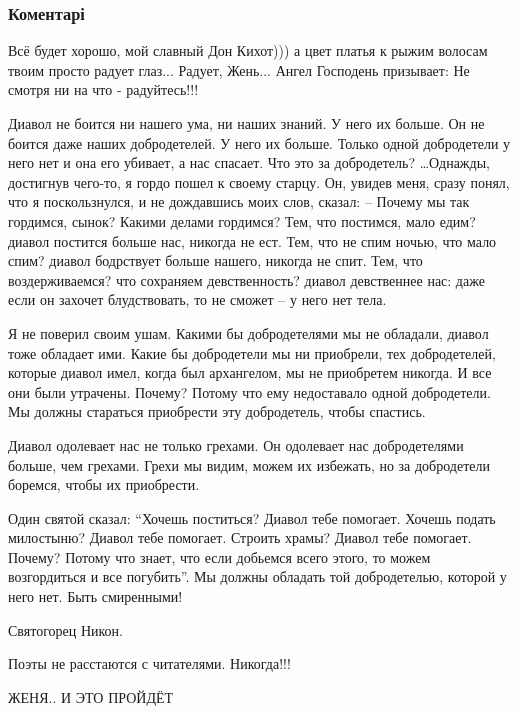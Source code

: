  
 
 
 
 
\subsubsection{Коментарі}
\label{sec:24_06_2021.fb.bilchenko_evgenia.3.kamni_mojej_princessy.cmt}
\begin{itemize}


Всё будет хорошо, мой славный Дон Кихот))) а цвет платья к рыжим волосам твоим
просто радует глаз... Радует, Жень... Ангел Господень призывает: Не смотря ни
на что - радуйтесь!!!


Диавол не боится ни нашего ума, ни наших знаний. У него их больше. Он не боится
даже наших добродетелей. У него их больше. Только одной добродетели у него нет
и она его убивает, а нас спасает. Что это за добродетель? …Однажды, достигнув
чего-то, я гордо пошел к своему старцу. Он, увидев меня, сразу понял, что я
поскользнулся, и не дождавшись моих слов, сказал: – Почему мы так гордимся,
сынок? Какими делами гордимся? Тем, что постимся, мало едим? диавол постится
больше нас, никогда не ест. Тем, что не спим ночью, что мало спим? диавол
бодрствует больше нашего, никогда не спит. Тем, что воздерживаемся? что
сохраняем девственность? диавол девственнее нас: даже если он захочет
блудствовать, то не сможет – у него нет тела.

Я не поверил своим ушам. Какими бы добродетелями мы не обладали, диавол тоже
обладает ими. Какие бы добродетели мы ни приобрели, тех добродетелей, которые
диавол имел, когда был архангелом, мы не приобретем никогда. И все они были
утрачены. Почему? Потому что ему недоставало одной добродетели. Мы должны
стараться приобрести эту добродетель, чтобы спастись.

Диавол одолевает нас не только грехами. Он одолевает нас добродетелями больше,
чем грехами. Грехи мы видим, можем их избежать, но за добродетели боремся,
чтобы их приобрести.

Один святой сказал: \enquote{Хочешь поститься? Диавол тебе помогает. Хочешь подать
милостыню? Диавол тебе помогает. Строить храмы? Диавол тебе помогает. Почему?
Потому что знает, что если добьемся всего этого, то можем возгордиться и все
погубить}. Мы должны обладать той добродетелью, которой у него нет. Быть
смиренными!

Святогорец Никон.

Поэты не расстаются с читателями. Никогда!!!💐


ЖЕНЯ.. И ЭТО ПРОЙДЁТ

\end{itemize}
